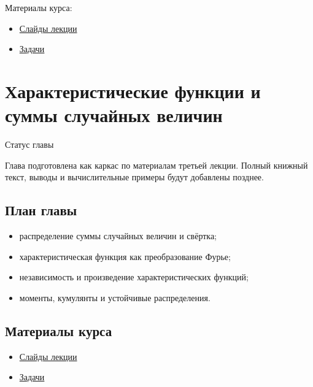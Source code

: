 \documentclass[
  russian,
  letterpaper,
]{scrbook}
\providecommand{\tightlist}{%
  \setlength{\itemsep}{0pt}\setlength{\parskip}{0pt}}
\begin{document}
Материалы курса:

\begin{itemize}
\tightlist
\item
  \href{https://neutrinohit.github.io/statistical-analysis-course/ru/slides/01_random_distributions.html}{Слайды
  лекции}
\item
  \href{https://neutrinohit.github.io/statistical-analysis-course/ru/slides/exercises/01_random_distributions_exercises.html}{Задачи}
\end{itemize}

\chapter{Характеристические функции и суммы случайных
величин}\label{ux445ux430ux440ux430ux43aux442ux435ux440ux438ux441ux442ux438ux447ux435ux441ux43aux438ux435-ux444ux443ux43dux43aux446ux438ux438-ux438-ux441ux443ux43cux43cux44b-ux441ux43bux443ux447ux430ux439ux43dux44bux445-ux432ux435ux43bux438ux447ux438ux43d}

{Статус главы}

Глава подготовлена как каркас по материалам третьей лекции. Полный
книжный текст, выводы и вычислительные примеры будут добавлены позднее.

\section{План
главы}\label{ux43fux43bux430ux43d-ux433ux43bux430ux432ux44b-1}

\begin{itemize}
\tightlist
\item
  распределение суммы случайных величин и свёртка;
\item
  характеристическая функция как преобразование Фурье;
\item
  независимость и произведение характеристических функций;
\item
  моменты, кумулянты и устойчивые распределения.
\end{itemize}

\section{Материалы
курса}\label{ux43cux430ux442ux435ux440ux438ux430ux43bux44b-ux43aux443ux440ux441ux430}

\begin{itemize}
\tightlist
\item
  \href{https://neutrinohit.github.io/statistical-analysis-course/ru/slides/02_characteristic_functions.html}{Слайды
  лекции}
\item
  \href{https://neutrinohit.github.io/statistical-analysis-course/ru/slides/exercises/02_characteristic_functions_exercises.html}{Задачи}
\end{itemize}
\end{document}
